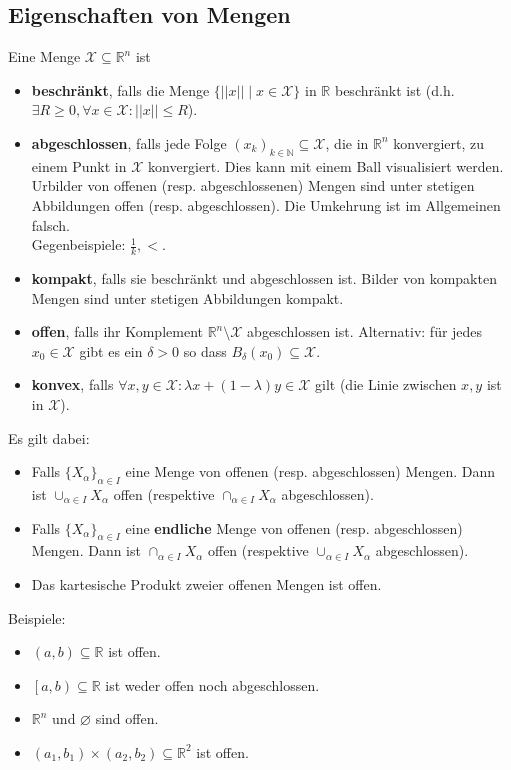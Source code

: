 \documentclass[a4paper,10pt]{article}
\def\R{\mathbb{R}}
\def\N{\mathbb{N}}
\def\X{\mathcal{X}}
\begin{document}
\subsection{Eigenschaften von Mengen}
Eine Menge \(\X \subseteq \R^n \) ist
\begin{itemize}
  \item \textbf{beschränkt}, falls die Menge \(\{ ||x|| \mid x \in \X \}\) in \(\R\) beschränkt ist (d.h. \(\exists R \ge 0, \forall x \in \X: ||x|| \le R\)).
  \item \textbf{abgeschlossen}, falls jede Folge \((x_k)_{k\in \N} \subseteq \X\), die in \(\R^n\) konvergiert, zu einem Punkt in \(\X\) konvergiert. Dies kann mit einem Ball visualisiert werden. Urbilder von offenen (resp. abgeschlossenen) Mengen sind unter stetigen Abbildungen offen (resp. abgeschlossen). Die Umkehrung ist im Allgemeinen falsch.\\
  Gegenbeispiele: \(\frac{1}{k}, <\).
  \item \textbf{kompakt}, falls sie beschränkt und abgeschlossen ist. Bilder von kompakten Mengen sind unter stetigen Abbildungen kompakt.
  \item \textbf{offen}, falls ihr Komplement \(\R^n \setminus \X\) abgeschlossen ist. Alternativ: für jedes $x_0 \in \X$ gibt es ein $\delta > 0$ so dass $B_\delta(x_0) \subseteq \X$.
  \item \textbf{konvex}, falls \(\forall x, y \in \X: \lambda x + (1 - \lambda)y \in \X\) gilt (die Linie zwischen \(x, y\) ist in \(\X\)).
\end{itemize}

Es gilt dabei:

\begin{itemize}
  \item Falls $\{X_\alpha\}_{\alpha \in I}$ eine Menge von offenen (resp. abgeschlossen) Mengen. Dann ist $\cup_{\alpha \in I} X_\alpha$ offen (respektive $\cap_{\alpha \in I} X_\alpha$ abgeschlossen).
  \item Falls $\{X_\alpha\}_{\alpha \in I}$ eine \textbf{endliche} Menge von offenen (resp. abgeschlossen) Mengen. Dann ist $\cap_{\alpha \in I} X_\alpha$ offen (respektive $\cup_{\alpha \in I} X_\alpha$ abgeschlossen).
  \item Das kartesische Produkt zweier offenen Mengen ist offen.
\end{itemize}

Beispiele:
\begin{itemize}
  \item \((a,b) \subseteq \R\) ist offen.
  \item \(\left[a,b\right) \subseteq \R\) ist weder offen noch abgeschlossen.
  \item \(\R^n\) und \(\varnothing\) sind offen.
  \item \((a_1, b_1) \times (a_2,b_2) \subseteq \R^2\) ist offen.
\end{itemize}
\end{document}
